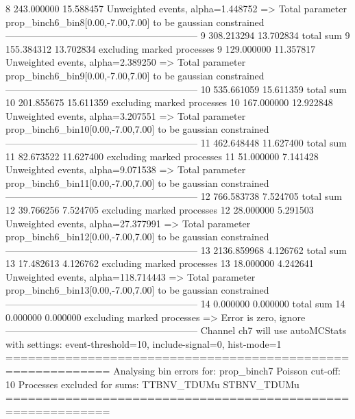 8          243.000000      15.588457       Unweighted events, alpha=1.448752
  => Total parameter prop_binch6_bin8[0.00,-7.00,7.00] to be gaussian constrained
------------------------------------------------------------
9          308.213294      13.702834       total sum                     
9          155.384312      13.702834       excluding marked processes    
9          129.000000      11.357817       Unweighted events, alpha=2.389250
  => Total parameter prop_binch6_bin9[0.00,-7.00,7.00] to be gaussian constrained
------------------------------------------------------------
10         535.661059      15.611359       total sum                     
10         201.855675      15.611359       excluding marked processes    
10         167.000000      12.922848       Unweighted events, alpha=3.207551
  => Total parameter prop_binch6_bin10[0.00,-7.00,7.00] to be gaussian constrained
------------------------------------------------------------
11         462.648448      11.627400       total sum                     
11         82.673522       11.627400       excluding marked processes    
11         51.000000       7.141428        Unweighted events, alpha=9.071538
  => Total parameter prop_binch6_bin11[0.00,-7.00,7.00] to be gaussian constrained
------------------------------------------------------------
12         766.583738      7.524705        total sum                     
12         39.766256       7.524705        excluding marked processes    
12         28.000000       5.291503        Unweighted events, alpha=27.377991
  => Total parameter prop_binch6_bin12[0.00,-7.00,7.00] to be gaussian constrained
------------------------------------------------------------
13         2136.859968     4.126762        total sum                     
13         17.482613       4.126762        excluding marked processes    
13         18.000000       4.242641        Unweighted events, alpha=118.714443
  => Total parameter prop_binch6_bin13[0.00,-7.00,7.00] to be gaussian constrained
------------------------------------------------------------
14         0.000000        0.000000        total sum                     
14         0.000000        0.000000        excluding marked processes    
  => Error is zero, ignore      
------------------------------------------------------------
Channel ch7 will use autoMCStats with settings: event-threshold=10, include-signal=0, hist-mode=1
============================================================
Analysing bin errors for: prop_binch7
Poisson cut-off: 10
Processes excluded for sums: TTBNV_TDUMu STBNV_TDUMu
============================================================
